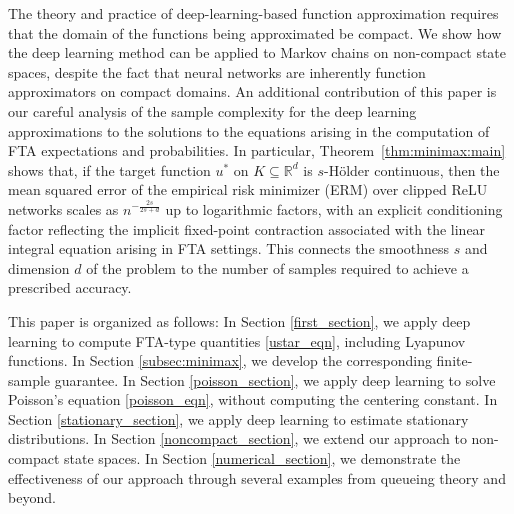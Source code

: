 \documentclass[pdflatex,sn-mathphys-ay]{sn-jnl}%
\numberwithin{equation}{section}
\newcommand{\R}{\mathbb{R}}
\theoremstyle{thmstyleone}%
\theoremstyle{thmstyletwo}%
\theoremstyle{thmstylethree}%
\begin{document}
The theory and practice of deep-learning-based function approximation requires that the domain of the functions being approximated be compact. We show how the deep learning method can be applied to Markov chains on non-compact state spaces, despite the fact that neural networks are  inherently function approximators on compact domains. An additional contribution of this paper is our careful analysis of the sample complexity for the deep learning approximations to the solutions to the equations arising in the computation of FTA expectations and probabilities. In particular, Theorem~\ref{thm:minimax:main} shows that, if the target function $u^*$ on $K\subseteq\R^d$ is $s$-H\"older continuous, then the mean squared error of the empirical risk minimizer (ERM) over clipped ReLU networks scales as $n^{-\frac{2s}{2s+d}}$ up to logarithmic factors, with an explicit conditioning factor reflecting the implicit fixed-point contraction associated with the linear integral equation arising in FTA settings. This connects the smoothness $s$ and dimension $d$ of the problem to the number of samples required to achieve a prescribed accuracy.

This paper is organized as follows: In Section \ref{first_section}, we apply deep learning to compute FTA-type quantities \eqref{ustar_eqn}, including Lyapunov functions. In Section \ref{subsec:minimax}, we develop the corresponding finite-sample guarantee. In Section \ref{poisson_section}, we apply deep learning to solve Poisson's equation \eqref{poisson_eqn}, without computing the centering constant. 
In Section \ref{stationary_section}, we apply deep learning to estimate stationary distributions.
In Section \ref{noncompact_section}, we extend our approach to non-compact state spaces. In Section \ref{numerical_section}, we demonstrate the effectiveness of our approach through several examples from queueing theory and beyond.
\end{document}
